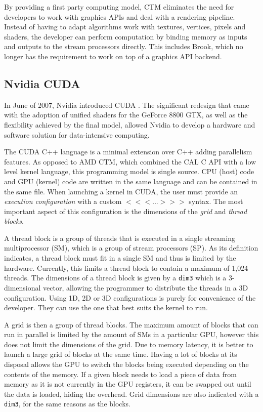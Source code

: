 By providing a first party computing model, CTM eliminates the need for developers to work with graphics APIs and deal with a rendering pipeline. Instead of having to adapt algorithms work with textures, vertices, pixels and shaders, the developer can perform computation by binding memory as inputs and outputs to the stream processors directly. This includes Brook, which no longer has the requirement to work on top of a graphics API backend.

\subsection{Nvidia CUDA} \label{STATE:cuda}

In June of 2007, Nvidia introduced CUDA \cite{cuda_toolkit_archive}. The significant redesign that came with the adoption of unified shaders for the GeForce 8800 GTX, as well as the flexibility achieved by the final model, allowed Nvidia to develop a hardware and software solution for data-intensive computing.

The CUDA C++ language is a minimal extension over C++ adding parallelism features. As opposed to AMD CTM, which combined the CAL C API with a low level kernel language, this programming model is single source. CPU (host) code and GPU (kernel) code are written in the same language and can be contained in the same file. When launching a kernel in CUDA, the user must provide an \textit{execution configuration} with a custom $<<< ... >>>$ syntax. The most important aspect of this configuration is the dimensions of the \textit{grid} and \textit{thread blocks}.

A thread block is a group of threads that is executed in a single streaming multiprocessor (SM), which is a group of stream processors (SP). As its definition indicates, a thread block must fit in a single SM and thus is limited by the hardware. Currently, this limits a thread block to contain a maximum of 1,024 threads. The dimensions of a thread block is given by a \texttt{dim3} which is a 3-dimensional vector, allowing the programmer to distribute the threads in a 3D configuration. Using 1D, 2D or 3D configurations is purely for convenience of the developer. They can use the one that best suits the kernel to run.

A grid is then a group of thread blocks. The maximum amount of blocks that can run in parallel is limited by the amount of SMs in a particular GPU, however this does not limit the dimensions of the grid. Due to memory latency, it is better to launch a large grid of blocks at the same time. Having a lot of blocks at its disposal allows the GPU to switch the blocks being executed depending on the contents of the memory. If a given block needs to load a piece of data from memory as it is not currently in the GPU registers, it can be swapped out until the data is loaded, hiding the overhead. Grid dimensions are also indicated with a \texttt{dim3}, for the same reasons as the blocks.

